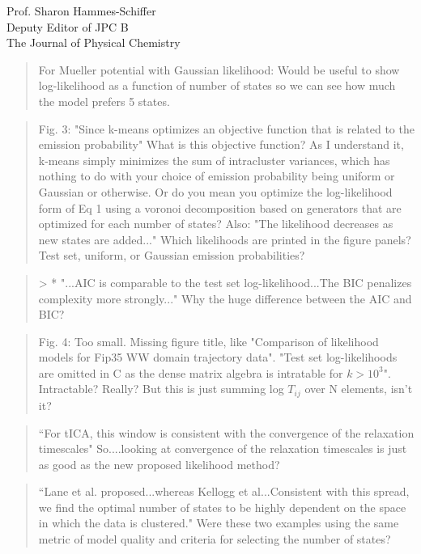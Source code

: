 \documentclass{letter}
\begin{document}
\begin{letter}{Prof. Sharon Hammes-Schiffer \\ Deputy Editor of JPC B \\ The Journal of Physical Chemistry}
\begin{quote}
For Mueller potential with Gaussian likelihood: Would be useful to show log-likelihood as a function of number of states so we can see how much the model prefers 5 states.
\end{quote}

\begin{quote}
Fig. 3: "Since k-means optimizes an objective function that is related to the emission probability" What is this objective function?  As I understand it, k-means simply minimizes the sum of intracluster variances, which has nothing to do with your choice of emission probability being uniform or Gaussian or otherwise. Or do you mean you optimize the log-likelihood form of Eq 1 using a voronoi decomposition based on generators that are optimized for each number of states?  Also: "The likelihood decreases as new states are added..."  Which likelihoods are printed in the figure panels?  Test set, uniform, or Gaussian emission probabilities?
\end{quote}

\begin{quote}
> * "...AIC is comparable to the test set log-likelihood...The BIC penalizes complexity more strongly..." Why the huge difference between the AIC and BIC?
\end{quote}

\begin{quote}
Fig. 4: Too small.  Missing figure title, like "Comparison of likelihood models for Fip35 WW domain trajectory data".  "Test set log-likelihoods are omitted in C as the dense matrix algebra is intratable for $k > 10^3$".  Intractable?  Really?  But this is just summing log $T_{ij}$ over N elements, isn't it?
\end{quote}

\begin{quote}
``For tICA, this window is consistent with the convergence of the relaxation timescales"  So....looking at convergence of the relaxation timescales is just as good as the new proposed likelihood method?
\end{quote}

\begin{quote}
``Lane et al. proposed...whereas Kellogg et al...Consistent with this spread, we find the optimal number of states to be highly dependent on the space in which the data is clustered."  Were these two examples using the same metric of model quality and criteria for selecting the number of states?
\end{quote}


\end{letter}
\end{document}
